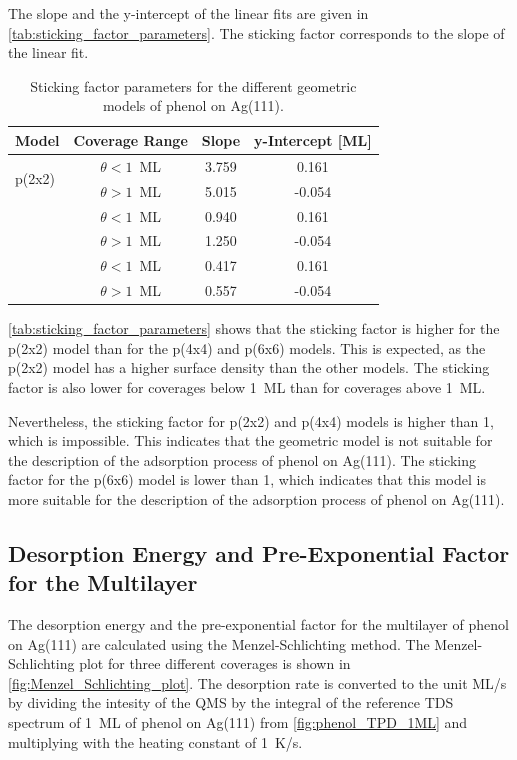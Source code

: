\documentclass[fontsize=11pt,reqno,a4paper,oneside]{scrartcl}
\begin{document}
The slope and the y-intercept of the linear fits are given in \autoref{tab:sticking_factor_parameters}. The sticking factor corresponds to the slope of the linear fit. 
\begin{table}[htbp]
    \centering
    \caption{Sticking factor parameters for the different geometric models of phenol on Ag(111).}
    \begin{tabular}{@{}lccc@{}}
        \toprule
        \multicolumn{1}{c}{Model} & Coverage Range & Slope & y-Intercept [ML] \\
        \midrule
        \multirow{2}{*}{p(2x2)} & $\theta < 1$~ML & 3.759 & 0.161 \\
                                & $\theta > 1$~ML & 5.015 & -0.054 \\ 
        \addlinespace[0.5em]
        \multirow{2}{*}{p(4x4)} & $\theta < 1$~ML & 0.940 & 0.161 \\
                                & $\theta > 1$~ML & 1.250 & -0.054 \\
        \addlinespace[0.5em]
        \multirow{2}{*}{p(6x6)} & $\theta < 1$~ML & 0.417 & 0.161 \\
                                & $\theta > 1$~ML & 0.557 & -0.054 \\
        \bottomrule
    \end{tabular}
    \label{tab:sticking_factor_parameters}
\end{table}

\autoref{tab:sticking_factor_parameters} shows that the sticking factor is higher for the p(2x2) model than for the p(4x4) and p(6x6) models. This is expected, as the p(2x2) model has a higher surface density than the other models. The sticking factor is also lower for coverages below 1~ML than for coverages above 1~ML.

Nevertheless, the sticking factor for p(2x2) and p(4x4) models is higher than 1, which is impossible. This indicates that the geometric model is not suitable for the description of the adsorption process of phenol on Ag(111). The sticking factor for the p(6x6) model is lower than 1, which indicates that this model is more suitable for the description of the adsorption process of phenol on Ag(111).

\clearpage
\subsection{Desorption Energy and Pre-Exponential Factor for the Multilayer}

The desorption energy and the pre-exponential factor for the multilayer of phenol on Ag(111) are calculated using the Menzel-Schlichting method.\autocite{Schlichting1992} The Menzel-Schlichting plot for three different coverages is shown in \autoref{fig:Menzel_Schlichting_plot}. The desorption rate is converted to the unit ML/s by dividing the intesity of the \ac{QMS} by the integral of the reference \ac{TDS} spectrum of 1~ML of phenol on Ag(111) from \autoref{fig:phenol_TPD_1ML} and multiplying with the heating constant of 1~K/s.
\end{document}
